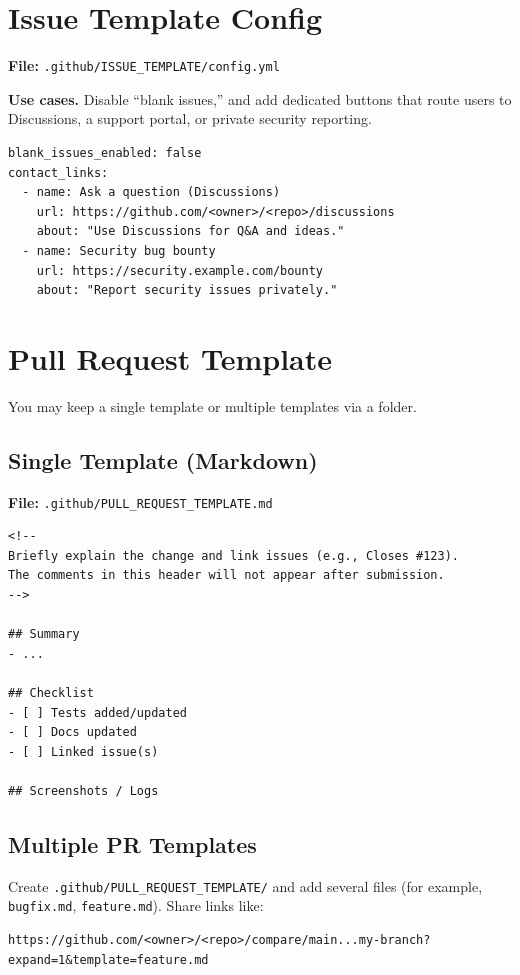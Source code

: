 \documentclass[11pt]{article}
\begin{document}
\section{Issue Template Config}
\noindent\textbf{File:} \texttt{.github/ISSUE\_TEMPLATE/config.yml}
\begin{tcolorbox}
\textbf{Use cases.} Disable ``blank issues,'' and add dedicated buttons that route users to Discussions,
a support portal, or private security reporting.
\end{tcolorbox}

\begin{verbatim}
blank_issues_enabled: false
contact_links:
  - name: Ask a question (Discussions)
    url: https://github.com/<owner>/<repo>/discussions
    about: "Use Discussions for Q&A and ideas."
  - name: Security bug bounty
    url: https://security.example.com/bounty
    about: "Report security issues privately."
\end{verbatim}
\clearpage

\section{Pull Request Template}
You may keep a single template or multiple templates via a folder.

\subsection{Single Template (Markdown)}
\noindent\textbf{File:} \texttt{.github/PULL\_REQUEST\_TEMPLATE.md}
\begin{verbatim}
<!--
Briefly explain the change and link issues (e.g., Closes #123).
The comments in this header will not appear after submission.
-->

## Summary
- ...

## Checklist
- [ ] Tests added/updated
- [ ] Docs updated
- [ ] Linked issue(s)

## Screenshots / Logs
\end{verbatim}

\subsection{Multiple PR Templates}
Create \nolinkurl{.github/PULL_REQUEST_TEMPLATE/} and add several files (for example,
\texttt{bugfix.md}, \texttt{feature.md}). Share links like:
\begin{verbatim}
https://github.com/<owner>/<repo>/compare/main...my-branch?expand=1&template=feature.md
\end{verbatim}
\clearpage
\end{document}
